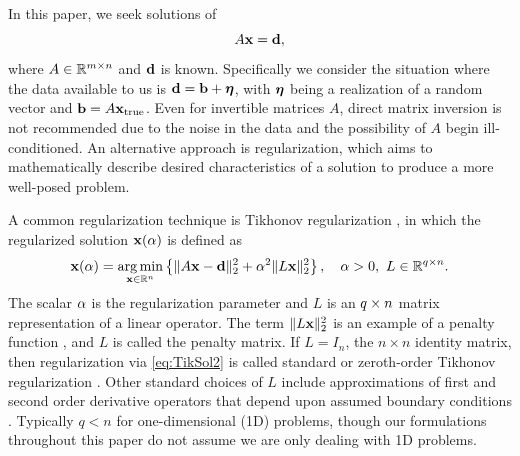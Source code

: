 \documentclass[12pt]{article}
\begin{document}
In this paper, we seek solutions of 
\begin{equation}
\label{eq:Ax = b}
A\mathbf{x} = \mathbf{d},
\end{equation}
where $A \in \mathbb{R}^{m \times n}$ and $\mathbf{d}$ is known. Specifically we consider the situation where the data available to us is $\mathbf{d} = \mathbf{b} + \bm{\eta}$, with $\bm{\eta}$ being a realization of a random vector and $\mathbf{b} = A\mathbf{x}_{\text{true}}$. Even for invertible matrices $A$, direct matrix inversion is not recommended due to the noise in the data and the possibility of $A$ begin ill-conditioned. An alternative approach is regularization, which aims to mathematically describe desired characteristics of a solution to produce a more well-posed problem. \par
A common regularization technique is Tikhonov regularization \cite{Tikh1963}, in which the regularized solution $\mathbf{x}(\alpha)$ is defined as
\begin{equation}
\label{eq:TikSol2}
\mathbf{x}(\alpha) = \operatorname*{arg\,min}_{\mathbf{x} \in \mathbb{R}^n} \left\{\|A\mathbf{x} - \mathbf{d}\|_2^2 + \alpha^2\|L\mathbf{x}\|_2^2\right\}, \quad \alpha > 0, ~ L \in \mathbb{R}^{q \times n}.
\end{equation}
The scalar $\alpha$ is the regularization parameter and $L$ is an $q \times n$ matrix representation of a linear operator. The term $\|L\mathbf{x}\|_2^2$ is an example of a penalty function \cite{Vogel:2002}, and $L$ is called the penalty matrix. If $L = I_n$, the $n \times n$ identity matrix, then regularization via \eqref{eq:TikSol2} is called standard or zeroth-order Tikhonov regularization \cite{ABT}. Other standard choices of $L$ include approximations of first and second order derivative operators that depend upon assumed boundary conditions \cite{NeumannDCT,Strang1999,Vogel:2002}. Typically $q < n$ for one-dimensional (1D) problems, though our formulations throughout this paper do not assume we are only dealing with 1D problems. \par 
\end{document}
